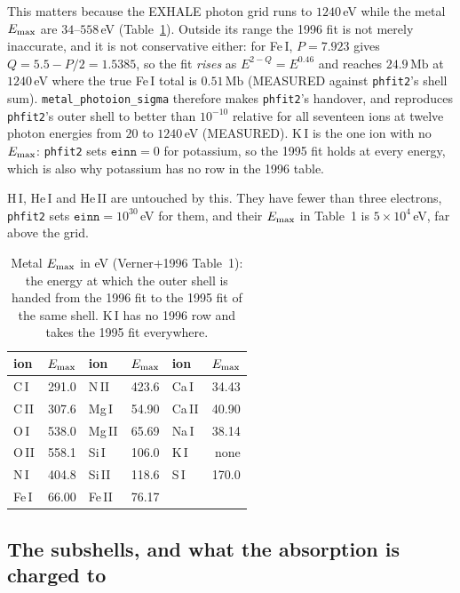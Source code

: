 \documentclass[english,a4paper]{my_memo}
\newcommand{\Mb}{\mathrm{Mb}}
\begin{document}
This matters because the EXHALE photon grid runs to $1240\,$eV while the
metal $E_{\rm max}$ are $34$--$558\,$eV (Table~\ref{tab:emax}). Outside its
range the 1996 fit is not merely inaccurate, and it is not conservative
either: for Fe\,I, $P = 7.923$ gives $Q = 5.5 - P/2 = 1.5385$, so the fit
\emph{rises} as $E^{2-Q} = E^{0.46}$ and reaches $24.9\,\Mb$ at $1240\,$eV
where the true Fe\,I total is $0.51\,\Mb$ (MEASURED against
\texttt{phfit2}'s shell sum). \texttt{metal\_photoion\_sigma} therefore
makes \texttt{phfit2}'s handover, and reproduces \texttt{phfit2}'s outer
shell to better than $10^{-10}$ relative for all seventeen ions at twelve
photon energies from $20$ to $1240\,$eV (MEASURED). K\,I is the one ion with
no $E_{\rm max}$: \texttt{phfit2} sets $\texttt{einn} = 0$ for potassium, so
the 1995 fit holds at every energy, which is also why potassium has no row
in the 1996 table.

H\,I, He\,I and He\,II are untouched by this. They have fewer than three
electrons, \texttt{phfit2} sets $\texttt{einn} = 10^{30}\,$eV for them, and
their $E_{\rm max}$ in Table~1 is $5\times10^{4}\,$eV, far above the grid.

\begin{table}[h]
\centering
\caption{Metal $E_{\rm max}$ in eV (Verner+1996 Table~1): the energy at
which the outer shell is handed from the 1996 fit to the 1995 fit of the
same shell. K\,I has no 1996 row and takes the 1995 fit everywhere.}
\label{tab:emax}
\begin{tabular}{lrlrlr}
\toprule
ion & $E_{\rm max}$ & ion & $E_{\rm max}$ & ion & $E_{\rm max}$\\
\midrule
C\,I  & 291.0 & N\,II  & 423.6 & Ca\,I  &  34.43\\
C\,II & 307.6 & Mg\,I  &  54.90 & Ca\,II &  40.90\\
O\,I  & 538.0 & Mg\,II &  65.69 & Na\,I  &  38.14\\
O\,II & 558.1 & Si\,I  & 106.0 & K\,I   & none\\
N\,I  & 404.8 & Si\,II & 118.6 & S\,I   & 170.0\\
Fe\,I &  66.00 & Fe\,II &  76.17 &        &      \\
\bottomrule
\end{tabular}
\end{table}

\subsection{The subshells, and what the absorption is charged
to}\label{sec:metal-subshell}
\end{document}
